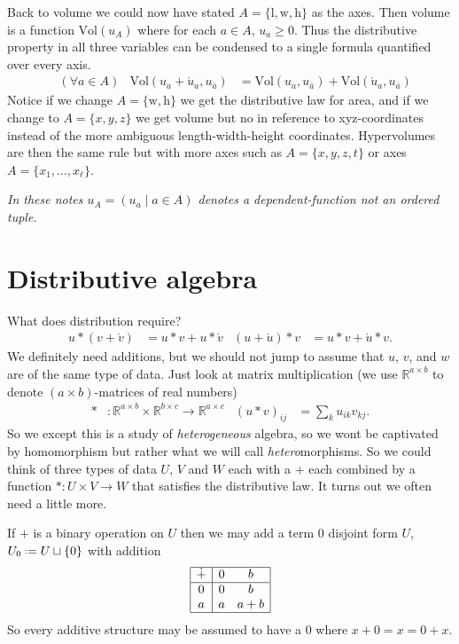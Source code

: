 Back to volume we could now have stated $A=\{\text{l},\text{w},\text{h}\}$ as the axes.
Then volume is a function $\text{Vol}(u_A)$ where for each $a\in A$, $u_a\geq 0$.  Thus 
the distributive property in all three variables can be condensed to a single formula 
quantified over every axis.
\begin{align*}
    & (\forall a\in A)
    &
    \text{Vol}(u_{a}+\acute{u}_a,u_{\bar{a}}) & = \text{Vol}(u_a,u_{\bar{a}}) + \text{Vol}(\acute{u}_a,u_{\bar{a}}) 
\end{align*}
Notice if we change $A=\{\text{w},\text{h}\}$ we get the distributive law for area, 
and if we change to $A=\{x,y,z\}$ we get volume but no in reference to xyz-coordinates
instead of the more ambiguous length-width-height coordinates.  Hypervolumes are 
then the same rule but with more axes such as $A=\{x,y,z,t\}$ or axes $A=\{x_1,\ldots, x_{\ell}\}$.

\emph{In these notes $u_A=(u_a\mid a\in A)$ denotes a dependent-function not an ordered tuple.}

\section{Distributive algebra}


What does distribution require?
\begin{align}
    u*(v+\acute{v}) & = u*v+u*\acute{v}
    & 
    (u+\acute{u})*v & = u*v + \acute{u}*v.
\end{align}
We definitely need additions, but we should not jump to assume that $u$, $v$, and $w$ are 
of the same type of data.  Just look at  matrix 
multiplication (we use $\mathbb{R}^{a\times b}$ to denote $(a\times b)$-matrices 
of real numbers)
\begin{align*}
    *&:\mathbb{R}^{a\times b}\times \mathbb{R}^{b\times c}\to \mathbb{R}^{a\times c}
    &
    (u*v)_{ij} & = \sum_k u_{ik}v_{kj}.
\end{align*}
So we except this is a study of \emph{heterogeneous} algebra, so we wont be
captivated by homomorphism but rather what we will call \emph{hetero}morphisms.
So we could think of three types of data $U$, $V$ and $W$ each with a $+$ each
combined by a function 
$*:U\times V\to W$ that satisfies the distributive law.  It turns out we often need a 
little more.

\begin{proposition}
    If $+$ is a binary operation on $U$ then we may add a term $0$ disjoint form $U$, 
    $U_0\defeq U\sqcup \{0\}$ with addition 
    \begin{align*}
        \begin{array}{|c|cc|}
            \hline 
            \dot{+} & 0 & b \\
            \hline 
            0 & 0 & b\\
            a & a & a+b \\
            \hline 
        \end{array}
    \end{align*}
    So every additive structure may be assumed to have a $0$ where $x+0=x=0+x$.
\end{proposition}



